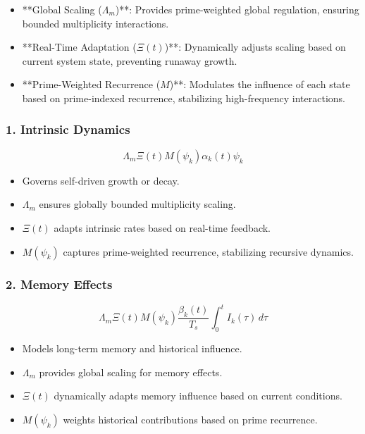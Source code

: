 \documentclass[12pt]{article}
\theoremstyle{plain}
\begin{document}
\begin{itemize}
    \item **Global Scaling (\(\Lambda_m\))**: Provides prime-weighted global regulation, ensuring bounded multiplicity interactions.
    \item **Real-Time Adaptation (\(\Xi(t)\))**: Dynamically adjusts scaling based on current system state, preventing runaway growth.
    \item **Prime-Weighted Recurrence (\(M\))**: Modulates the influence of each state based on prime-indexed recurrence, stabilizing high-frequency interactions.
\end{itemize}

\subsubsection{1. Intrinsic Dynamics}

\[
\Lambda_m \Xi(t) M(\psi_k) \alpha_k(t) \psi_k
\]

\begin{itemize}
    \item Governs self-driven growth or decay.
    \item \( \Lambda_m \) ensures globally bounded multiplicity scaling.
    \item \( \Xi(t) \) adapts intrinsic rates based on real-time feedback.
    \item \( M(\psi_k) \) captures prime-weighted recurrence, stabilizing recursive dynamics.
\end{itemize}

\subsubsection{2. Memory Effects}

\[
\Lambda_m \Xi(t) M(\psi_k) \frac{\beta_k(t)}{T_s} \int_0^t I_k(\tau) \, d\tau
\]

\begin{itemize}
    \item Models long-term memory and historical influence.
    \item \( \Lambda_m \) provides global scaling for memory effects.
    \item \( \Xi(t) \) dynamically adapts memory influence based on current conditions.
    \item \( M(\psi_k) \) weights historical contributions based on prime recurrence.
\end{itemize}
\end{document}
